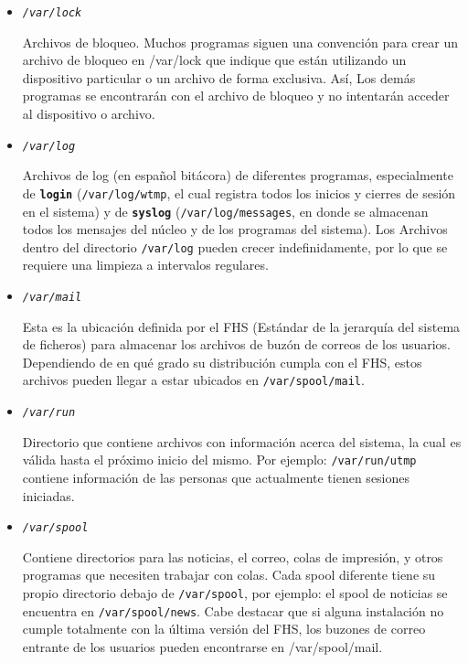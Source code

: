 \begin{itemize}
	\item 
        
	\textit{\texttt{/var/lock}} 
        
	 Archivos de bloqueo. Muchos programas siguen una
	convención para crear un archivo de bloqueo en /var/lock que indique que
	están utilizando un dispositivo particular o un archivo de forma
	exclusiva. Así, Los demás programas se encontrarán con el archivo de
	bloqueo y no intentarán acceder al dispositivo o archivo.
	  

	\item 

	\textit{\texttt{/var/log}} 

	  Archivos de log (en español bitácora) de diferentes
	 programas, especialmente de \texttt{\textbf{login}}
	 (\texttt{/var/log/wtmp}, el cual registra todos los inicios
	 y cierres de sesión en el sistema) y de \texttt{\textbf{syslog}}
	 (\texttt{/var/log/messages}, en donde se almacenan todos
	 los mensajes del núcleo y de los programas del sistema). Los Archivos
	 dentro del directorio \texttt{/var/log} pueden crecer
	 indefinidamente, por lo que se requiere una limpieza a intervalos
	 regulares.   

	\item 
        
	\textit{\texttt{/var/mail}} 
        
	 Esta es la ubicación definida por el FHS (Estándar de la
	jerarquía del sistema de ficheros) para almacenar los archivos de buzón
	de correos de los usuarios. Dependiendo de en qué 		grado su
	distribución cumpla con el FHS, estos archivos pueden 	llegar a
	estar ubicados en \texttt{/var/spool/mail}.
	  

	\item 

	\textit{\texttt{/var/run}} 
        
	 Directorio que contiene archivos con información acerca
	del sistema, la cual es válida hasta el próximo inicio del mismo. Por
	ejemplo: \texttt{/var/run/utmp} contiene información de las
	personas que actualmente tienen sesiones iniciadas.  
	 

	\item 
        
	\textit{\texttt{/var/spool}} 
        
	 Contiene directorios para las noticias, el correo, colas
	de impresión, y otros programas que necesiten trabajar con colas.
	Cada spool diferente tiene su propio directorio debajo de
	\texttt{/var/spool}, por ejemplo: el spool de noticias se
	encuentra en \texttt{/var/spool/news}. Cabe destacar que si
	alguna instalación no cumple totalmente con la última versión del
	FHS, los buzones de correo entrante de los usuarios pueden encontrarse
	en /var/spool/mail.   


\end{itemize}
